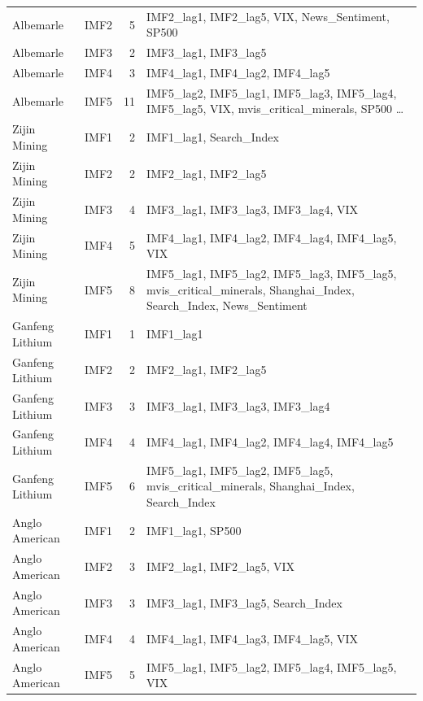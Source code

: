 \begin{longtable}{llrp{8.5cm}}
Albemarle & IMF2 & 5 & IMF2\_lag1, IMF2\_lag5, VIX, News\_Sentiment, SP500 \\
Albemarle & IMF3 & 2 & IMF3\_lag1, IMF3\_lag5 \\
Albemarle & IMF4 & 3 & IMF4\_lag1, IMF4\_lag2, IMF4\_lag5 \\
Albemarle & IMF5 & 11 & IMF5\_lag2, IMF5\_lag1, IMF5\_lag3, IMF5\_lag4, IMF5\_lag5, VIX, mvis\_critical\_minerals, SP500 … \\
Zijin Mining & IMF1 & 2 & IMF1\_lag1, Search\_Index \\
Zijin Mining & IMF2 & 2 & IMF2\_lag1, IMF2\_lag5 \\
Zijin Mining & IMF3 & 4 & IMF3\_lag1, IMF3\_lag3, IMF3\_lag4, VIX \\
Zijin Mining & IMF4 & 5 & IMF4\_lag1, IMF4\_lag2, IMF4\_lag4, IMF4\_lag5, VIX \\
Zijin Mining & IMF5 & 8 & IMF5\_lag1, IMF5\_lag2, IMF5\_lag3, IMF5\_lag5, mvis\_critical\_minerals, Shanghai\_Index, Search\_Index, News\_Sentiment \\
Ganfeng Lithium & IMF1 & 1 & IMF1\_lag1 \\
Ganfeng Lithium & IMF2 & 2 & IMF2\_lag1, IMF2\_lag5 \\
Ganfeng Lithium & IMF3 & 3 & IMF3\_lag1, IMF3\_lag3, IMF3\_lag4 \\
Ganfeng Lithium & IMF4 & 4 & IMF4\_lag1, IMF4\_lag2, IMF4\_lag4, IMF4\_lag5 \\
Ganfeng Lithium & IMF5 & 6 & IMF5\_lag1, IMF5\_lag2, IMF5\_lag5, mvis\_critical\_minerals, Shanghai\_Index, Search\_Index \\
Anglo American & IMF1 & 2 & IMF1\_lag1, SP500 \\
Anglo American & IMF2 & 3 & IMF2\_lag1, IMF2\_lag5, VIX \\
Anglo American & IMF3 & 3 & IMF3\_lag1, IMF3\_lag5, Search\_Index \\
Anglo American & IMF4 & 4 & IMF4\_lag1, IMF4\_lag3, IMF4\_lag5, VIX \\
Anglo American & IMF5 & 5 & IMF5\_lag1, IMF5\_lag2, IMF5\_lag4, IMF5\_lag5, VIX \\
\end{longtable}
